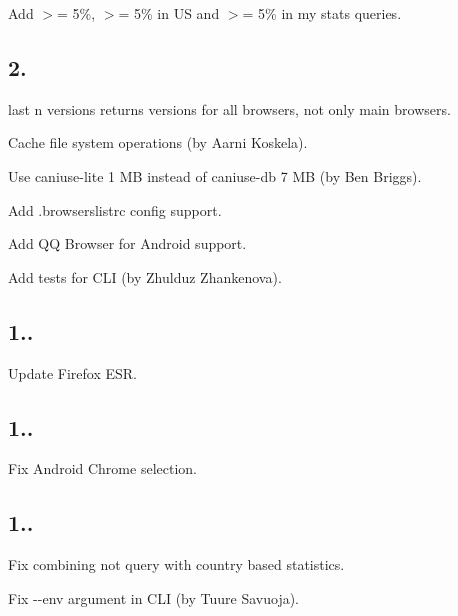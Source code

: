 \begin{DoxyItemize}
\item Add {\ttfamily $>$= 5\%}, {\ttfamily $>$= 5\% in US} and {\ttfamily $>$= 5\% in my stats} queries.
\end{DoxyItemize}

\subsection*{2.}


\begin{DoxyItemize}
\item {\ttfamily last n versions} returns versions for all browsers, not only main browsers.
\item Cache file system operations (by Aarni Koskela).
\item Use {\ttfamily caniuse-\/lite} 1 MB instead of {\ttfamily caniuse-\/db} 7 MB (by Ben Briggs).
\item Add {\ttfamily .browserslistrc} config support.
\item Add QQ Browser for Android support.
\item Add tests for C\+LI (by Zhulduz Zhankenova).
\end{DoxyItemize}

\subsection*{1..}


\begin{DoxyItemize}
\item Update Firefox E\+SR.
\end{DoxyItemize}

\subsection*{1..}


\begin{DoxyItemize}
\item Fix Android Chrome selection.
\end{DoxyItemize}

\subsection*{1..}


\begin{DoxyItemize}
\item Fix combining {\ttfamily not} query with country based statistics.
\item Fix {\ttfamily -\/-\/env} argument in C\+LI (by Tuure Savuoja).
\end{DoxyItemize}

